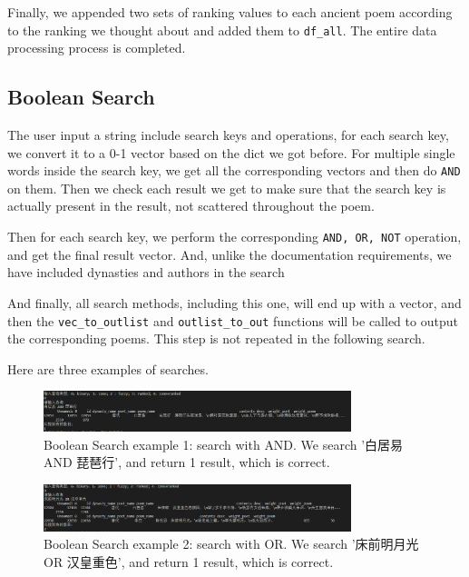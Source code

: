 Finally, we appended two sets of ranking values to each ancient poem according to the ranking we thought about and added them to \lstinline{df_all}. The entire data processing process is completed.


\subsection{Boolean Search}

The user input a string include search keys and operations, 
for each search key, we convert it to a 0-1 vector based on the dict we got before. For multiple single words inside the search key, we get all the corresponding vectors and then do \lstinline{AND} on them. Then we check each result we get to make sure that the search key is actually present in the result, not scattered throughout the poem. 

Then for each search key, we perform the corresponding \lstinline{AND, OR, NOT} operation, and get the final result vector. And, unlike the documentation requirements,  we have included dynasties and authors in the search


And finally, all search methods, including this one, will end up with a vector, and then the \lstinline{vec_to_outlist} and  \lstinline{outlist_to_out} functions will be called to output the corresponding poems. This step is not repeated in the following search.

Here are three examples of searches.


\begin{figure}[h]
\centering
\includegraphics[width=0.8\textwidth]{figure/boolean-1.png}
\caption{Boolean Search example 1: search with AND. We search '白居易 AND 琵琶行', and return 1 result, which is correct.}
\label{search-1}
\end{figure}

\begin{figure}[h]
\centering
\includegraphics[width=0.8\textwidth]{figure/boolean-or.png}
\caption{Boolean Search example 2: search with OR. We search '床前明月光 OR 汉皇重色', and return 1 result, which is correct.}
\label{search-2}
\end{figure}

